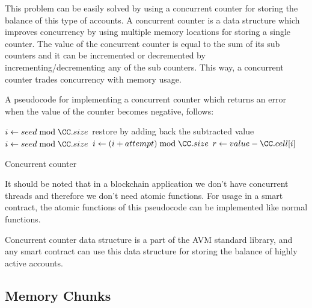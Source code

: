 \documentclass[11pt, A4]{report}
\begin{document}
    This problem can be easily solved by using a concurrent counter for storing the balance of this type of
    accounts. A concurrent counter is a data structure which improves concurrency by using multiple memory locations for
    storing a single counter. The value of the concurrent counter is equal to the sum of its sub counters and it can
    be incremented or decremented by incrementing/decrementing any of the sub counters. This way, a concurrent
    counter trades concurrency with memory usage.

    A pseudocode for implementing a concurrent counter which returns an error when the value of the counter
    becomes negative, follows:

    \begin{algorithm}
        \DontPrintSemicolon
        \BlankLine
        {
            $i \gets seed \bmod \CC.size$\;
           \;
        }
        \BlankLine
        {
            {
                restore \CC by adding back the subtracted value\;
                \;
            }
            $i \gets seed \bmod \CC.size$\;
            $i \gets (i + attempt) \bmod \CC.size$\;
            {
                \;
            }{
                $r \gets value - \CC.cell[i]$\;
                \;
                \;
            }
        }
        \caption{Concurrent counter}\label{alg:CC}
    \end{algorithm}

    It should be noted that in a blockchain application we don't have concurrent threads and therefore we don't need
    atomic functions. For usage in a smart contract, the atomic functions of this pseudocode can be implemented like
    normal functions.

    Concurrent counter data structure is a part of the AVM standard library, and any smart contract can use this data
    structure for storing the balance of highly active accounts.

    \subsection{Memory Chunks}\label{subsec:memory-chunks}
\end{document}
